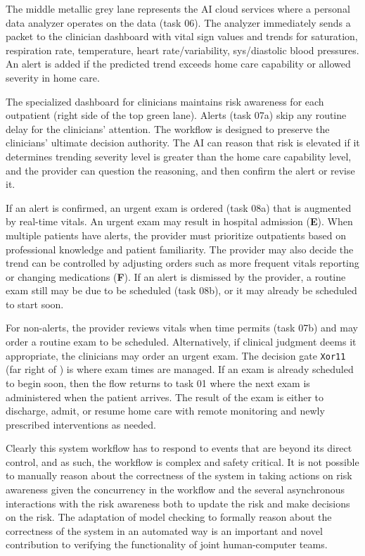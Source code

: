 The middle metallic grey lane represents the AI cloud services where a personal data analyzer operates on the data (task 06).  The analyzer immediately sends a packet to the clinician dashboard with vital sign values and trends for saturation, respiration rate, temperature, heart rate/variability, sys/diastolic blood pressures. An alert is added if the predicted trend exceeds home care capability or allowed severity in home care.

The specialized dashboard for clinicians maintains risk awareness for each outpatient (right side of the top green lane). Alerts (task 07a) skip any routine delay for the clinicians' attention. The workflow is designed to preserve the clinicians' ultimate decision authority. The AI can reason that risk is elevated if it determines trending severity level is greater than the home care capability level, and the provider can question the reasoning, and then confirm the alert or revise it. 

If an alert is confirmed, an urgent exam is ordered (task 08a) that is augmented by real-time vitals. An urgent exam may result in hospital admission (\textbf{E}). When multiple patients have alerts, the provider must prioritize outpatients based on professional knowledge and patient familiarity. The provider may also decide the trend can be controlled by adjusting orders such as more frequent vitals reporting or changing medications (\textbf{F}). If an alert is dismissed by the provider, a routine exam still may be due to be scheduled (task 08b), or it may already be scheduled to start soon. 

For non-alerts, the provider reviews vitals when time permits (task 07b) and may order a routine exam to be scheduled. Alternatively, if clinical judgment deems it appropriate, the clinicians may order an urgent exam. The decision gate \texttt{Xor11} (far right of ) is where exam times are managed. If an exam is already scheduled to begin soon, then the flow returns to task 01 where the next exam is administered when the patient arrives. The result of the exam is either to discharge, admit, or resume home care with remote monitoring and newly prescribed interventions as needed.

Clearly this system workflow has to respond to events that are beyond its direct control, and as such, the workflow is complex and safety critical. It is not possible to manually reason about the correctness of the system in taking actions on risk awareness given the concurrency in the workflow and the several asynchronous interactions with the risk awareness both to update the risk and make decisions on the risk. The adaptation of model checking to formally reason about the correctness of the system in an automated way is an important and novel contribution to verifying the functionality of joint human-computer teams.

